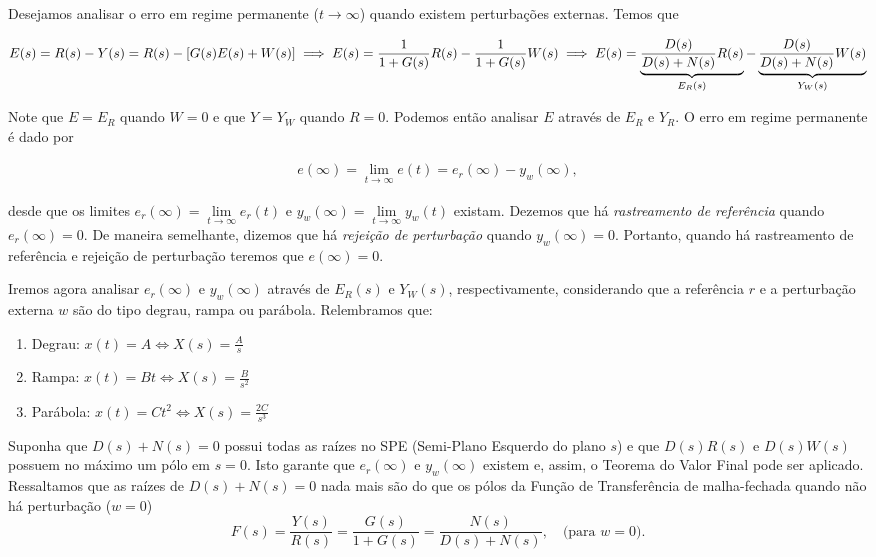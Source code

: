 \documentclass[
]{book}
\providecommand{\tightlist}{%
  \setlength{\itemsep}{0pt}\setlength{\parskip}{0pt}}
\begin{document}
Desejamos analisar o erro em regime permanente (\(t \to \infty\)) quando existem perturbações externas. Temos que

\[
E(s) = R(s) - Y(s) = R(s) - [G(s)E(s) + W(s)]\\
\implies E(s) = \frac {1}{1 + G(s)}R(s) - \frac {1}{1+G(s)}W(s) \\
\implies E(s) = \underbrace{\frac {D(s)}{D(s) + N(s)}R(s)}_{E_R(s)} - \underbrace{\frac {D(s)}{D(s) + N(s)}W(s)}_{Y_W(s)}
\]

Note que \(E = E_R\) quando \(W= 0\) e que \(Y = Y_W\) quando \(R=0\). Podemos então analisar \(E\) através de \(E_R\) e \(Y_R\). O erro em regime permanente é dado por

\begin{align}
e(\infty) = \lim\limits_{t \to \infty}{e(t)} = e_r(\infty) - y_w(\infty), \label{eq:eq41}
\end{align}

desde que os limites \(e_r(\infty) = \lim\limits_{t\to \infty}{e_r(t)}\) e \(y_w(\infty) = \lim\limits_{t \to \infty}{y_w(t)}\) existam. Dezemos que há \emph{rastreamento de referência} quando \(e_r(\infty) = 0\). De maneira semelhante, dizemos que há \emph{rejeição de perturbação} quando \(y_w(\infty) = 0\). Portanto, quando há rastreamento de referência e rejeição de perturbação teremos que \(e(\infty) = 0\).

Iremos agora analisar \(e_r(\infty)\) e \(y_w(\infty)\) através de \(E_R(s)\) e \(Y_W(s)\), respectivamente, considerando que a referência \(r\) e a perturbação externa \(w\) são do tipo degrau, rampa ou parábola. Relembramos que:

\begin{enumerate}
\def\labelenumi{\arabic{enumi}.}
\tightlist
\item
  Degrau: \(x(t) = A \iff X(s) = \frac {A}{s}\)
\item
  Rampa: \(x(t) = Bt \iff X(s) = \frac {B}{s^2}\)
\item
  Parábola: \(x(t) = Ct^2 \iff X(s) = \frac {2C}{s^3}\)
\end{enumerate}

Suponha que \(D(s) + N(s) = 0\) possui todas as raízes no SPE (Semi-Plano Esquerdo do plano \(s\)) e que \(D(s)R(s)\) e \(D(s)W(s)\) possuem no máximo um pólo em \(s=0\). Isto garante que \(e_r(\infty)\) e \(y_w(\infty)\) existem e, assim, o Teorema do Valor Final pode ser aplicado. Ressaltamos que as raízes de \(D(s) + N(s) = 0\) nada mais são do que os pólos da Função de Transferência de malha-fechada quando não há perturbação (\(w=0\))
\[
F(s) = \frac {Y(s)}{R(s)} = \frac{G(s)}{1+G(s)} = \frac {N(s)}{D(s)+N(s)}, \quad \text{(para } w=0 \text{).}
\]
\end{document}
